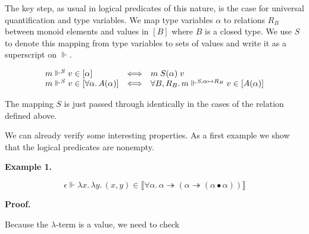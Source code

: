 \documentclass[10pt,a4paper]{amsart}
\begin{document}
 
 
The key step, as usual in logical predicates of this nature, is the case for universal quantification and type variables. We map type variables $\alpha$ to relations $R_{B}$ between monoid elements and values in $[B]$ where $B$ is a closed type. We use $S$ to denote this mapping from type variables to sets of values and write it as a superscript on $\Vdash$.\par
  
\par  \quad  \[\begin{array}[]{lcl}m\Vdash^{S}v\in[\alpha]&\Longleftrightarrow&m\mathrel{S(\alpha)}v\\
m\Vdash^{S}v\in[\forall\alpha.\,A(\alpha)]&\Longleftrightarrow&\forall B,R_{B}.\,m\Vdash^{S,\alpha\mapsto R_{B}}v\in[A(\alpha)]\end{array}\]\quad  \quad  
  
The mapping $S$ is just passed through identically in the cases of the relation defined above.\par
 
 
 
We can already verify some interesting properties. As a first example we show that the logical predicates are nonempty.\par
 
 
 
\par\medskip\noindent\textbf{Example 1.}\par
 
  
\par  \quad  \[\epsilon\Vdash\lambda x.\,\lambda y.\,(x,y)\in\llbracket\forall\alpha.\,\alpha\twoheadrightarrow(\alpha\twoheadrightarrow(\alpha\bullet\alpha))\rrbracket\]\quad  \quad  
  
 
 
 
\par\medskip\noindent\textbf{Proof.}\par
 
 
Because the $\lambda$-term is a value, we need to check\par
  
\end{document}
